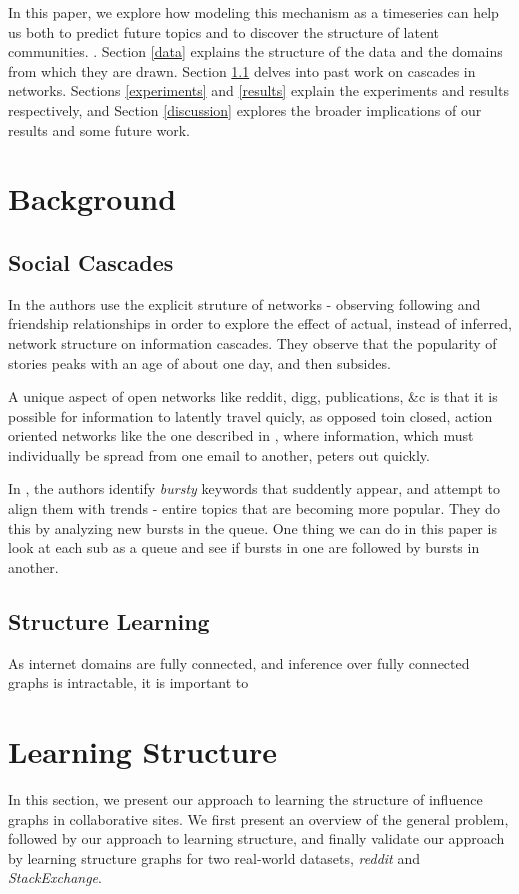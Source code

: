 \documentclass{article} %
\begin{document}
In this paper, we explore how modeling this mechanism as a timeseries can help us both to predict future topics and to discover the structure of latent communities. . Section \ref{data} explains the structure of the data and the domains from which they are drawn. Section \ref{cascades} delves into past work on cascades in networks. Sections \ref{experiments} and \ref{results} explain the experiments and results respectively, and Section \ref{discussion} explores the broader implications of our results and some future work. 

\section{Background}

\subsection{Social Cascades}
\label{cascades}

In \cite{info_contag} the authors use the explicit struture of networks - observing following and friendship relationships in order to explore the effect of actual, instead of inferred, network structure on information cascades. They observe that the popularity of stories peaks with an age of about one day, and then subsides. 

A unique aspect of open networks like reddit, digg, publications, \&c is that it is possible for information to latently travel quicly, as opposed toin closed, action oriented networks like the one described in \cite{viral_dynamics}, where information, which must individually be spread from one email to another, peters out quickly.

In \cite{twitter_trend}, the authors identify \textit{bursty} keywords that suddently appear, and attempt to align them with trends - entire topics that are becoming more popular. They do this by analyzing new bursts in the queue. One thing we can do in this paper is look at each sub as a queue and see if bursts in one are followed by bursts in another.

\subsection{Structure Learning}

As internet domains are fully connected, and inference over fully connected graphs is intractable, it is important to 
\section{Learning Structure}
In this section, we present our approach to learning the structure of influence graphs in collaborative sites. We first present an overview of the general problem, followed by our approach to learning structure, and finally validate our approach by learning structure graphs for two real-world datasets, \textit{reddit} and \textit{StackExchange}.
\end{document}
